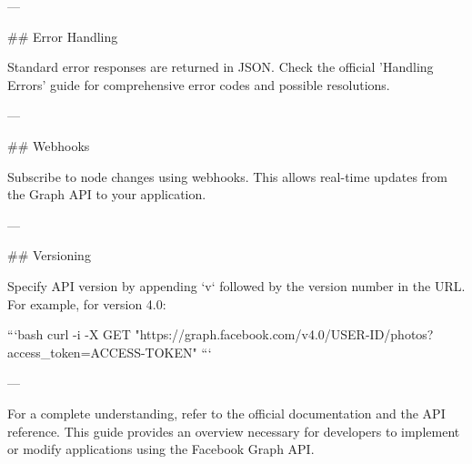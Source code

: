 ---

## Error Handling

Standard error responses are returned in JSON. Check the official 'Handling Errors' guide for comprehensive error codes and possible resolutions.

---

## Webhooks

Subscribe to node changes using webhooks. This allows real-time updates from the Graph API to your application.

---

## Versioning

Specify API version by appending `v` followed by the version number in the URL. For example, for version 4.0:

```bash
curl -i -X GET "https://graph.facebook.com/v4.0/USER-ID/photos?access_token=ACCESS-TOKEN"
```

---

For a complete understanding, refer to the official documentation and the API reference. This guide provides an overview necessary for developers to implement or modify applications using the Facebook Graph API.
